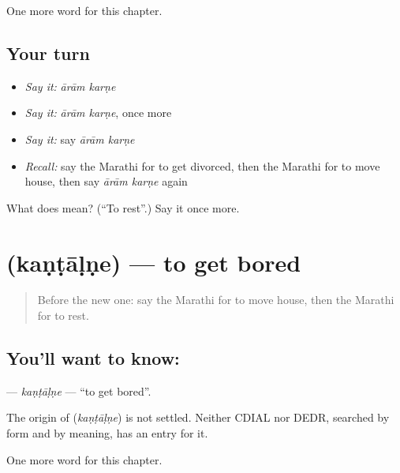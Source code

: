 \begin{grammarlens}[title={What you've built}]
One more word for this chapter.
\end{grammarlens}

\subsection*{Your turn}
\begin{itemize}
\raggedright
  \item \emph{Say it:} \emph{ārām karṇe}
  \item \emph{Say it:} \emph{ārām karṇe}, once more
  \item \emph{Say it:} say \emph{ārām karṇe}
  \item \emph{Recall:} say the Marathi for to get divorced, then the Marathi for to move house, then say \emph{ārām karṇe} again
\end{itemize}

\begin{tcolorbox}[breakable,colback=teal!4,colframe=teal!35!black,title={Before you move on}]
What does   mean? (\textquotedblleft{}To rest\textquotedblright{}.) Say it once more.
\end{tcolorbox}
\section[\texorpdfstring{\mr{कंटाळणे} (kaṇṭāḷṇe)}{कंटाळणे (kaṇṭāḷṇe)}]{ (kaṇṭāḷṇe) — to get bored}

\label{lesson:MR-C224-kantalne}



\begin{quote}
Before the new one: say the Marathi for to move house, then the Marathi for to rest.
\end{quote}

\subsection*{You'll want to know: }
\textbf{} — \emph{kaṇṭāḷṇe} — \textquotedblleft{}to get bored\textquotedblright{}.

\begin{cousinweb}
The origin of \textbf{} (\emph{kaṇṭāḷṇe}) is not settled. Neither CDIAL nor DEDR, searched by form and by meaning, has an entry for it.
\end{cousinweb}

\begin{grammarlens}[title={What you've built}]
One more word for this chapter.
\end{grammarlens}

